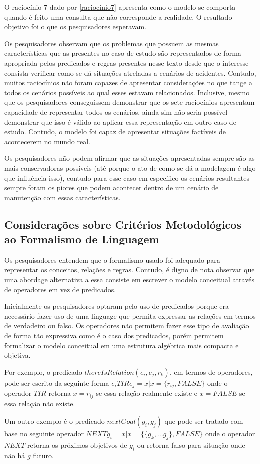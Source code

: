 O raciocínio 7 dado por \ref{raciocinio7} apresenta como o modelo se comporta quando é feito uma consulta que não corresponde a realidade. O resultado objetivo foi o que os pesquisadores esperavam. 

Os pesquisadores observam que os problemas que possuem as mesmas características que as presentes no caso de estudo são representados de forma apropriada pelos predicados e regras presentes nesse texto desde que o interesse consista verificar como se dá situações atreladas a cenários de acidentes. Contudo, muitos raciocínios não foram capazes de apresentar considerações no que tange a todos os cenários possíveis ao qual esses estavam relacionados. Inclusive, mesmo que os pesquisadores conseguissem demonstrar que os sete raciocínios apresentam capacidade de representar todos os cenários, ainda sim não seria 
possível demonstrar que isso é válido ao aplicar essa representação em outro caso de estudo. Contudo, o modelo foi capaz de apresentar situações factíveis 
de acontecerem no mundo real. 

Os pesquisadores não podem afirmar que as situações apresentadas sempre são as mais conservadoras possíveis (até porque o ato de como se dá a modelagem é algo que influência isso), contudo para esse caso em específico os cenários resultantes sempre foram os piores que podem acontecer dentro de um cenário de manutenção com essas características. 

\subsection{Considerações sobre Critérios Metodológicos ao Formalismo de Linguagem}

Os pesquisadores entendem que o formalismo usado foi adequado para representar os conceitos, relações e regras. Contudo, é digno de nota observar que uma abordage alternativa a essa consiste em escrever o modelo conceitual através de operadores em vez de predicados. 

Inicialmente os pesquisadores optaram pelo uso de predicados porque era necessário fazer uso de uma linguage que permita expressar as relações em termos de verdadeiro ou falso. Os operadores não permitem fazer esse tipo de avaliação de forma tão expressiva como é o caso dos predicados, porém permitem formalizar o modelo conceitual em uma estrutura algébrica mais compacta e objetiva. 

Por exemplo, o predicado $thereIsRelation(e_i,e_j,r_k)$, em termos de operadores, pode ser escrito da seguinte forma $e_i TIR e_j  = x | x =\{r_{ij},  FALSE \} $ onde o operador $TIR$ retorna $ x = r_{ij} $ se essa relação realmente existe e $ x = FALSE $ se essa relação não existe.  

Um outro exemplo é o predicado $nextGoal(g_i,g_j)$ que pode ser tratado com base no seguinte operador $ NEXT g_i = x | x = \{ \{ g_k, ... g_j \}, FALSE \}$ onde o operador $NEXT$ retorna os próximos objetivos de $g_i$ ou retorna falso para situação onde não há $g$ futuro.    

